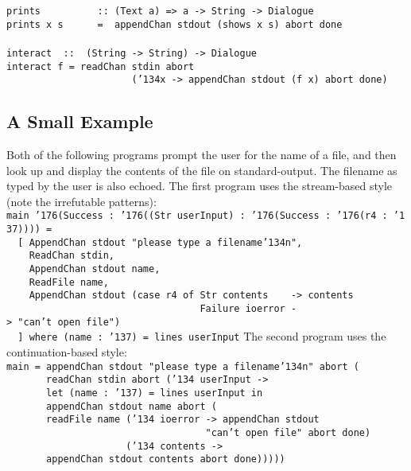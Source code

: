 \mbox{\tt prints\ \ \ \ \ \ \ \ \ \ ::\ (Text\ a)\ =>\ a\ ->\ String\ ->\ Dialogue}\\
\mbox{\tt prints\ x\ s\ \ \ \ \ \ =\ \ appendChan\ stdout\ (shows\ x\ s)\ abort\ done}\\
\mbox{\tt }\\[-8pt]
\mbox{\tt interact\ \ ::\ \ (String\ ->\ String)\ ->\ Dialogue}\\
\mbox{\tt interact\ f\ =\ readChan\ stdin\ abort}\\
\mbox{\tt \ \ \ \ \ \ \ \ \ \ \ \ \ \ \ \ \ \ \ \ \ \ ({\char'134}x\ ->\ appendChan\ stdout\ (f\ x)\ abort\ done)}
\eprogNoSkip
{}%

\subsection{A Small Example}

Both of the following programs prompt the user for the name of a
file, and then look up and display the contents of the file on
standard-output.  The filename as typed by the user is also echoed.
The first program uses the stream-based style (note the irrefutable
patterns):\nopagebreak[4]
\bprog
\mbox{\tt main\ {\char'176}(Success\ :\ {\char'176}((Str\ userInput)\ :\ {\char'176}(Success\ :\ {\char'176}(r4\ :\ {\char'137}))))\ =}\\
\mbox{\tt \ \ [\ AppendChan\ stdout\ "please\ type\ a\ filename{\char'134}n",}\\
\mbox{\tt \ \ \ \ ReadChan\ stdin,}\\
\mbox{\tt \ \ \ \ AppendChan\ stdout\ name,}\\
\mbox{\tt \ \ \ \ ReadFile\ name,}\\
\mbox{\tt \ \ \ \ AppendChan\ stdout\ (case\ r4\ of\ Str\ contents\ \ \ \ ->\ contents}\\
\mbox{\tt \ \ \ \ \ \ \ \ \ \ \ \ \ \ \ \ \ \ \ \ \ \ \ \ \ \ \ \ \ \ \ \ \ \ Failure\ ioerror\ ->\ "can't\ open\ file")}\\
\mbox{\tt \ \ ]\ where\ (name\ :\ {\char'137})\ =\ lines\ userInput}
\eprog
The second program uses the continuation-based style:\nopagebreak[4]
\bprog
\mbox{\tt main\ =\ appendChan\ stdout\ "please\ type\ a\ filename{\char'134}n"\ abort\ (}\\
\mbox{\tt \ \ \ \ \ \ \ readChan\ stdin\ abort\ ({\char'134}\ userInput\ ->}\\
\mbox{\tt \ \ \ \ \ \ \ let\ (name\ :\ {\char'137})\ =\ lines\ userInput\ in}\\
\mbox{\tt \ \ \ \ \ \ \ appendChan\ stdout\ name\ abort\ (}\\
\mbox{\tt \ \ \ \ \ \ \ readFile\ name\ ({\char'134}\ ioerror\ ->\ appendChan\ stdout\ }\\
\mbox{\tt \ \ \ \ \ \ \ \ \ \ \ \ \ \ \ \ \ \ \ \ \ \ \ \ \ \ \ \ \ \ \ \ \ \ \ "can't\ open\ file"\ abort\ done)}\\
\mbox{\tt \ \ \ \ \ \ \ \ \ \ \ \ \ \ \ \ \ \ \ \ \ ({\char'134}\ contents\ ->}\\
\mbox{\tt \ \ \ \ \ \ \ appendChan\ stdout\ contents\ abort\ done)))))}
\eprog

